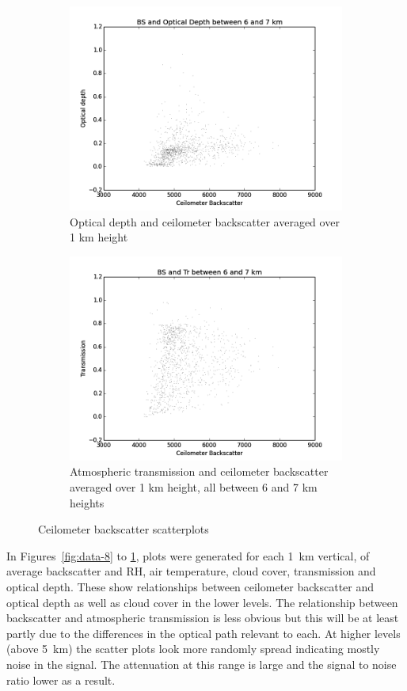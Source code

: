 \documentclass[a4paper,titlepage, twoside]{report}
\begin{document}
\begin{figure}
\begin{subfigure}{0.48\textwidth}
\includegraphics[width=\textwidth]{BS6_tau.png}
\caption{Optical depth and ceilometer backscatter averaged over 1 km height}
\end{subfigure}
\hfill
\begin{subfigure}{0.48\textwidth}
\includegraphics[width=\textwidth]{BS6_Tr.png}
\caption{Atmospheric transmission and ceilometer backscatter averaged over 1 km height, all  between 6 and 7 km heights}
\end{subfigure}
\caption{Ceilometer backscatter scatterplots}
\label{fig:data-14}
\end{figure}

In Figures~\ref{fig:data-8} to \ref{fig:data-14}, plots were generated for each \SI{1}{\kilo\meter} vertical, of average backscatter and RH, air temperature, cloud cover, transmission and optical depth. These show relationships between ceilometer  backscatter and optical depth as well as cloud cover in the lower levels. The relationship between backscatter and atmospheric transmission is less obvious but this will be at least partly due to the differences in the optical path relevant to each. At higher levels (above \SI{5}{\kilo\meter}) the scatter plots look more randomly spread indicating mostly noise in the signal. The attenuation at this range is large and the signal to noise ratio lower as a result.
\end{document}
